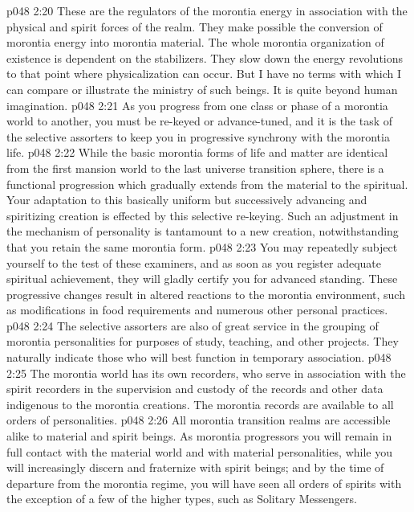 \vs p048 2:20 \bibnobreakspace {} These are the regulators of the morontia energy in association with the physical and spirit forces of the realm. They make possible the conversion of morontia energy into morontia material. The whole morontia organization of existence is dependent on the stabilizers. They slow down the energy revolutions to that point where physicalization can occur. But I have no terms with which I can compare or illustrate the ministry of such beings. It is quite beyond human imagination.
\vs p048 2:21 \bibnobreakspace {} As you progress from one class or phase of a morontia world to another, you must be re\hyp{}keyed or advance\hyp{}tuned, and it is the task of the selective assorters to keep you in progressive synchrony with the morontia life.
\vs p048 2:22 While the basic morontia forms of life and matter are identical from the first mansion world to the last universe transition sphere, there is a functional progression which gradually extends from the material to the spiritual. Your adaptation to this basically uniform but successively advancing and spiritizing creation is effected by this selective re\hyp{}keying. Such an adjustment in the mechanism of personality is tantamount to a new creation, notwithstanding that you retain the same morontia form.
\vs p048 2:23 You may repeatedly subject yourself to the test of these examiners, and as soon as you register adequate spiritual achievement, they will gladly certify you for advanced standing. These progressive changes result in altered reactions to the morontia environment, such as modifications in food requirements and numerous other personal practices.
\vs p048 2:24 The selective assorters are also of great service in the grouping of morontia personalities for purposes of study, teaching, and other projects. They naturally indicate those who will best function in temporary association.
\vs p048 2:25 \bibnobreakspace {} The morontia world has its own recorders, who serve in association with the spirit recorders in the supervision and custody of the records and other data indigenous to the morontia creations. The morontia records are available to all orders of personalities.
\vs p048 2:26 All morontia transition realms are accessible alike to material and spirit beings. As morontia progressors you will remain in full contact with the material world and with material personalities, while you will increasingly discern and fraternize with spirit beings; and by the time of departure from the morontia regime, you will have seen all orders of spirits with the exception of a few of the higher types, such as Solitary Messengers.
